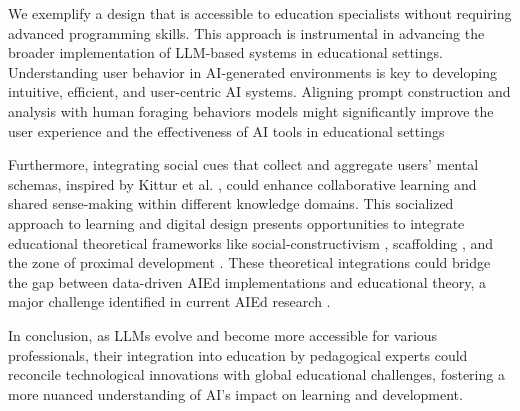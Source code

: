 \documentclass[sn-mathphys, Numbered]{sn-jnl}%
\theoremstyle{thmstyleone}%
\theoremstyle{thmstyletwo}%
\theoremstyle{thmstylethree}%
\begin{document}
We exemplify a design that is accessible to education specialists without requiring advanced programming skills. This approach is instrumental in advancing the broader implementation of LLM-based systems in educational settings. Understanding user behavior in AI-generated environments is key to developing intuitive, efficient, and user-centric AI systems. Aligning prompt construction and analysis with human foraging behaviors models might significantly improve the user experience and the effectiveness of AI tools in educational settings

Furthermore, integrating social cues that collect and aggregate users' mental schemas, inspired by Kittur et al. \parencite*{kittur_standing_2014}, could enhance collaborative learning and shared sense-making within different knowledge domains. This socialized approach to learning and digital design presents opportunities to integrate educational theoretical frameworks like social-constructivism \parencite{valente_maker_2019}, scaffolding \parencite{suwastini_schemes_2021, ak_role_2016}, and the zone of proximal development \parencite{crook_computers_1991, mckenney_designing_2013}.
These theoretical integrations could bridge the gap between data-driven AIEd implementations and educational theory, a major challenge identified in current AIEd research \parencite{holmes_state_2022, zawacki-richter_systematic_2019}. 

In conclusion, as LLMs evolve and become more accessible for various professionals, their integration into education by pedagogical experts could reconcile technological innovations with global educational challenges, fostering a more nuanced understanding of AI's impact on learning and development.






\printbibliography
\end{document}
